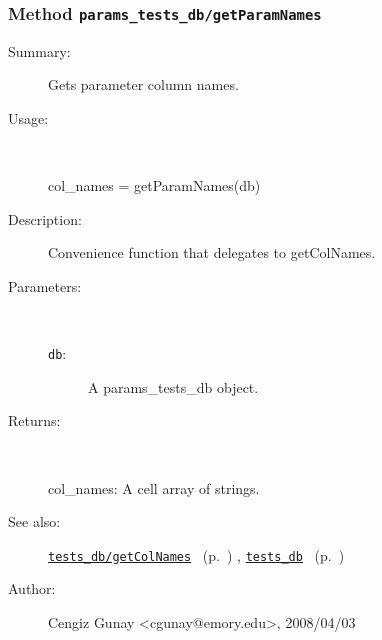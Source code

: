 \subsubsection[Method \texttt{getParamNames}]{Method \texttt{params\_tests\_db/getParamNames}}%
%
\label{ref_params_tests_db__getParamNames}%
\hypertarget{ref_params_tests_db__getParamNames}{}%
\begin{description}
\item[Summary:]Gets parameter column names.
%
\item[Usage:]~%
\begin{lyxcode}%
col\_names = getParamNames(db)
%
\end{lyxcode}%
%
\item[Description:]%
Convenience function that delegates to getColNames.
\item[Parameters:]~
\begin{description}%
\item[\texttt{db}:]
 A params\_tests\_db object.
\end{description}%
%
\item[Returns:
]~

   col\_names: A cell array of strings.
%
%
\item[See also:]%
\hyperlink{ref_tests_db__getColNames}{\texttt{tests\_db/getColNames}}%
\ (p.~\pageref{ref_tests_db__getColNames})%
%
, \hyperlink{ref_tests_db}{\texttt{tests\_db}}%
\ (p.~\pageref{ref_tests_db})%
%
%
\item[Author:]%
Cengiz Gunay <cgunay@emory.edu>, 2008/04/03
%
\end{description}
\methodline%
